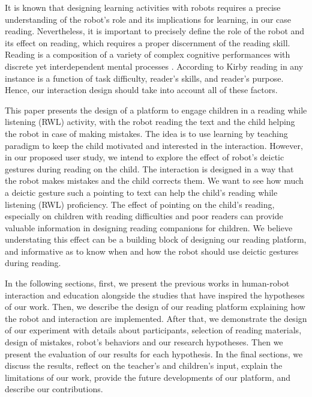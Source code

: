 \documentclass{sigchi}
\begin{document}
It is known that designing learning activities with robots requires a precise understanding of the robot's role and its implications for learning, in our case reading.
Nevertheless, it is important to precisely define the role of the robot and its effect on reading, which requires a proper discernment of the reading skill. 
Reading is a composition of a variety of complex cognitive performances with discrete yet interdependent mental processes \cite{kirby1988style}.  
According to Kirby \cite{kirby1988style} reading in any instance is a function of task difficulty, reader's skills, and reader's purpose. 
Hence,  our interaction design should take into account all of these factors.  


This paper presents the design of a platform to engage children in a reading while listening (RWL) activity, with the robot reading the text and the child helping the robot in case of making mistakes.
The idea is to use learning by teaching paradigm to keep the child motivated and interested in the interaction.
However, in our proposed user study, we intend to explore the effect of robot's deictic gestures during reading on the child. 
The interaction is designed in a way that the robot makes mistakes and the child corrects them.
We want to see how much a deictic gesture such a pointing to text can help the child's reading while listening (RWL) proficiency. 
The effect of pointing on the child's reading, especially on children with reading difficulties and poor readers can provide valuable information in designing reading companions for children. 
We believe understating this effect can be a building block of designing our reading platform, and informative as to know when and how the robot should use deictic gestures during reading. 


In the following sections, first, we present the previous works in human-robot interaction and education alongside the studies that have inspired the hypotheses of our work. 
Then, we describe the design of our reading platform explaining how the robot and interaction are implemented. 
After that, we demonstrate the design of our experiment with details about participants, selection of reading materials, design of mistakes, robot's behaviors and our research hypotheses. 
Then we present the evaluation of our results for each hypothesis. 
In the final sections, we discuss the results, reflect on the teacher's and children's input, explain the limitations of our work, provide the future developments of our platform, and describe our contributions.
\end{document}
